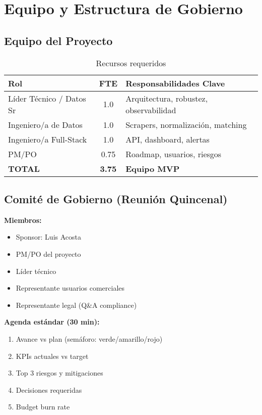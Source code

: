 \documentclass[12pt,a4paper]{article}
\begin{document}
\newpage
\section{Equipo y Estructura de Gobierno}

\subsection{Equipo del Proyecto}

\begin{table}[h]
\centering
\begin{tabularx}{\textwidth}{|X|c|X|}
\hline
\rowcolor{lightgray}
\textbf{Rol} & \textbf{FTE} & \textbf{Responsabilidades Clave} \\
\hline
Líder Técnico / Datos Sr & 1.0 & Arquitectura, robustez, observabilidad \\
\hline
Ingeniero/a de Datos & 1.0 & Scrapers, normalización, matching \\
\hline
Ingeniero/a Full-Stack & 1.0 & API, dashboard, alertas \\
\hline
PM/PO & 0.75 & Roadmap, usuarios, riesgos \\
\hline
\rowcolor{lightgray}
\textbf{TOTAL} & \textbf{3.75} & \textbf{Equipo MVP} \\
\hline
\end{tabularx}
\caption{Recursos requeridos}
\end{table}

\subsection{Comité de Gobierno (Reunión Quincenal)}

\textbf{Miembros:}
\begin{itemize}[leftmargin=*]
    \item Sponsor: Luis Acosta
    \item PM/PO del proyecto
    \item Líder técnico
    \item Representante usuarios comerciales
    \item Representante legal (Q\&A compliance)
\end{itemize}

\textbf{Agenda estándar (30 min):}
\begin{enumerate}[leftmargin=*]
    \item Avance vs plan (semáforo: verde/amarillo/rojo)
    \item KPIs actuales vs target
    \item Top 3 riesgos y mitigaciones
    \item Decisiones requeridas
    \item Budget burn rate
\end{enumerate}
\end{document}
